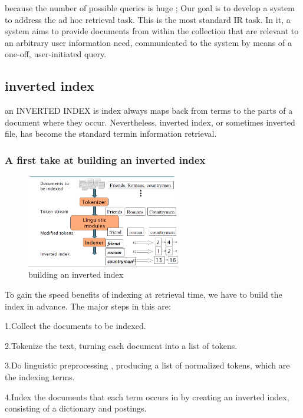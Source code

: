 because the number of possible queries is huge ; Our goal is to develop a system to address the ad hoc retrieval task. This is the most standard IR task. In it, a system aims to provide documents from within the collection that are relevant to an arbitrary user information need, communicated to the system by means of a one-off, user-initiated query.


\subsection{inverted index}

 an INVERTED INDEX is index always maps back from terms to the parts of a document where they occur. Nevertheless, inverted index, or sometimes inverted file, has become the standard termin information retrieval.
 
\subsubsection{A first take at building an inverted index}

\begin{figure}[H]%
    \center%
    \includegraphics[width=0.6\textwidth]{images/shimaa/building an inverted index.png}
    \caption[This is building an inverted index]{building an inverted index}\label{fig:building an inverted index}%
 \end{figure}
 
To gain the speed benefits of indexing at retrieval time, we have to build the
index in advance. The major steps in this are:

1.Collect the documents to be indexed.

2.Tokenize the text, turning each document into a list of tokens.

3.Do linguistic preprocessing , producing a list of normalized tokens, which
  are the indexing terms.
  
4.Index the documents that each term occurs in by creating an inverted index,
  consisting of a dictionary and postings.

